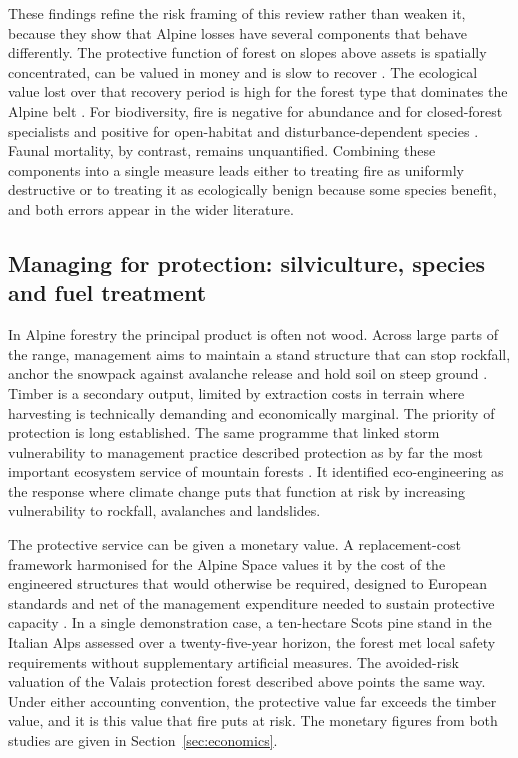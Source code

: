 \documentclass[11pt,a4paper]{article}
\begin{document}
These findings refine the risk framing of this review rather than weaken it, because they show that Alpine losses have several components that behave differently. The protective function of forest on slopes above assets is spatially concentrated, can be valued in money \citep{moos_climate_2021} and is slow to recover \citep{stritih_alternative_2023, degiuli_arrested_2024}. The ecological value lost over that recovery period is high for the forest type that dominates the Alpine belt \citep{arrogantefunes_mapping_2024}. For biodiversity, fire is negative for abundance and for closed-forest specialists and positive for open-habitat and disturbance-dependent species \citep{rey_effects_2019, degiuli_arrested_2024}. Faunal mortality, by contrast, remains unquantified. Combining these components into a single measure leads either to treating fire as uniformly destructive or to treating it as ecologically benign because some species benefit, and both errors appear in the wider literature.

\subsection{Managing for protection: silviculture, species and fuel treatment}

In Alpine forestry the principal product is often not wood. Across large parts of the range, management aims to maintain a stand structure that can stop rockfall, anchor the snowpack against avalanche release and hold soil on steep ground \citep{dinca_timber_2025}. Timber is a secondary output, limited by extraction costs in terrain where harvesting is technically demanding and economically marginal. The priority of protection is long established. The same programme that linked storm vulnerability to management practice described protection as by far the most important ecosystem service of mountain forests \citep{jandl_management_2013}. It identified eco-engineering as the response where climate change puts that function at risk by increasing vulnerability to rockfall, avalanches and landslides.

The protective service can be given a monetary value. A replacement-cost framework harmonised for the Alpine Space values it by the cost of the engineered structures that would otherwise be required, designed to European standards and net of the management expenditure needed to sustain protective capacity \citep{accastello_asforesee_2019}. In a single demonstration case, a ten-hectare Scots pine stand in the Italian Alps assessed over a twenty-five-year horizon, the forest met local safety requirements without supplementary artificial measures. The avoided-risk valuation of the Valais protection forest described above \citep{moos_climate_2021} points the same way. Under either accounting convention, the protective value far exceeds the timber value, and it is this value that fire puts at risk. The monetary figures from both studies are given in Section~\ref{sec:economics}.
\end{document}
